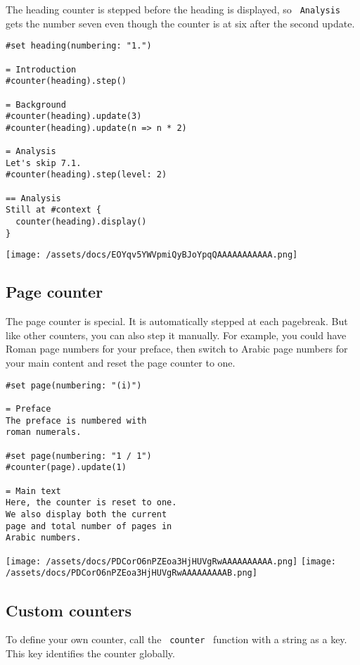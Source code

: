 The heading counter is stepped before the heading is displayed, so
\texttt{\ Analysis\ } gets the number seven even though the counter is
at six after the second update.

\begin{verbatim}
#set heading(numbering: "1.")

= Introduction
#counter(heading).step()

= Background
#counter(heading).update(3)
#counter(heading).update(n => n * 2)

= Analysis
Let's skip 7.1.
#counter(heading).step(level: 2)

== Analysis
Still at #context {
  counter(heading).display()
}
\end{verbatim}

\texttt{[image: /assets/docs/EOYqv5YWVpmiQyBJoYpqQAAAAAAAAAAA.png]}

\subsection{Page counter}\label{page-counter}

The page counter is special. It is automatically stepped at each
pagebreak. But like other counters, you can also step it manually. For
example, you could have Roman page numbers for your preface, then switch
to Arabic page numbers for your main content and reset the page counter
to one.

\begin{verbatim}
#set page(numbering: "(i)")

= Preface
The preface is numbered with
roman numerals.

#set page(numbering: "1 / 1")
#counter(page).update(1)

= Main text
Here, the counter is reset to one.
We also display both the current
page and total number of pages in
Arabic numbers.
\end{verbatim}

\texttt{[image: /assets/docs/PDCorO6nPZEoa3HjHUVgRwAAAAAAAAAA.png]}
\texttt{[image: /assets/docs/PDCorO6nPZEoa3HjHUVgRwAAAAAAAAAB.png]}

\subsection{Custom counters}\label{custom-counters}

To define your own counter, call the \texttt{\ counter\ } function with
a string as a key. This key identifies the counter globally.


